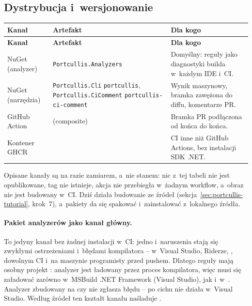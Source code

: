 \subsection{Dystrybucja i~wersjonowanie}\label{sec:portcullis-dystrybucja}

\begin{xltabular}{\linewidth}{@{}>{\raggedright\arraybackslash}p{2.9cm} >{\raggedright\arraybackslash}p{5.6cm} >{\raggedright\arraybackslash}X@{}}
\toprule
\textbf{Kanał} & \textbf{Artefakt} & \textbf{Dla kogo} \\
\midrule
\endfirsthead
\toprule
\textbf{Kanał} & \textbf{Artefakt} & \textbf{Dla kogo} \\
\midrule
\endhead
NuGet (analyzer) & \texttt{Portcullis.Analyzers} & Domyślny: reguły jako diagnostyki builda w~każdym IDE i~CI. \\
NuGet (narzędzia) & \texttt{Portcullis.Cli} \textrightarrow{} \texttt{portcullis}, \texttt{Portcullis.CiComment} \textrightarrow{} \texttt{portcullis-ci-comment} & Wynik maszynowy, bramka zawężona do diffu, komentarze PR. \\
GitHub Action &  (composite) & Bramka PR podłączona od końca do końca. \\
Kontener GHCR &  & CI inne niż GitHub Actions, bez instalacji SDK .NET. \\
\bottomrule
\end{xltabular}

Opisane kanały są na razie zamiarem, a~nie stanem: nic z~tej tabeli nie jest opublikowane,
tag  nie istnieje, akcja nie przebiegła w~żadnym workflow, a~obraz nie jest
budowany w~CI. Dziś działa budowanie ze źródeł (sekcja~\ref{sec:portcullis-tutorial},
krok~7), a~pakiety da się spakować i~zainstalować z~lokalnego źródła.

\paragraph{Pakiet analyzerów jako kanał główny.} To jedyny kanał bez żadnej instalacji
w~CI: jedno  i~naruszenia stają się zwykłymi ostrzeżeniami
i~błędami kompilatora -- w~Visual Studio, Riderze, , dowolnym CI i~na
maszynie programisty przed pushem. Dlatego reguły mają osobny projekt
: analyzer jest ładowany przez proces kompilatora, więc musi się
załadować zarówno w~MSBuild .NET Framework (Visual Studio), jak i~w~.
Analyzer zbudowany na  czy  nie zgłasza błędu -- po cichu
nie działa w~Visual Studio. Według źródeł ten kształt kanału naśladuje
.


